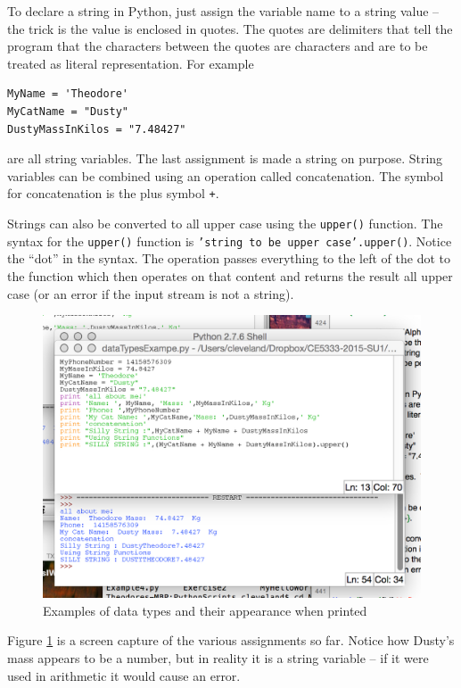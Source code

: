 To declare a string in Python, just assign the variable name to a string value -- the trick is the value is enclosed in quotes.  The quotes are delimiters that tell the program that the characters between the quotes are characters and are to be treated as literal representation.  For example
\begin{verbatim}
MyName = 'Theodore'
MyCatName = "Dusty"
DustyMassInKilos = "7.48427"
\end{verbatim}
are all string variables.  The last assignment is made a string on purpose.   String variables can be combined using an operation called concatenation.   The symbol for concatenation is the plus symbol \texttt{+}.  

Strings can also be converted to all upper case using the \texttt{upper()} function.   The syntax for the \texttt{upper()} function is \texttt{'string to be upper case'.upper()}.   Notice the ``dot'' in the syntax.   The operation passes everything to the left of the dot to the function which then operates on that content and returns the result all upper case (or an error if the input stream is not a string).

\begin{figure}[h!] %
   \centering
   \includegraphics[width=5in]{./4-DataTypes/DataTypesExample.jpg} 
   \caption{Examples of data types and their appearance when printed}
   \label{fig:DataTypesExample}
\end{figure}

Figure \ref{fig:DataTypesExample} is a screen capture of the various assignments so far.  Notice how Dusty's mass appears to be a number, but in reality it is a string variable -- if it were used in arithmetic it would cause an error.

